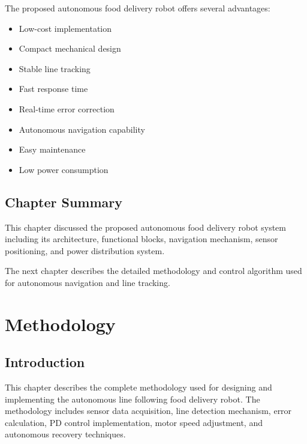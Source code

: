 \documentclass[12pt,a4paper,oneside]{report}
\begin{document}
The proposed autonomous food delivery robot offers several advantages:

\begin{itemize}
\item Low-cost implementation
\item Compact mechanical design
\item Stable line tracking
\item Fast response time
\item Real-time error correction
\item Autonomous navigation capability
\item Easy maintenance
\item Low power consumption
\end{itemize}


\section{Chapter Summary}

This chapter discussed the proposed autonomous food delivery robot system including its architecture, functional blocks, navigation mechanism, sensor positioning, and power distribution system.

The next chapter describes the detailed methodology and control algorithm used for autonomous navigation and line tracking.


\chapter{Methodology}

\section{Introduction}

This chapter describes the complete methodology used for designing and implementing the autonomous line following food delivery robot. The methodology includes sensor data acquisition, line detection mechanism, error calculation, PD control implementation, motor speed adjustment, and autonomous recovery techniques.
\end{document}
